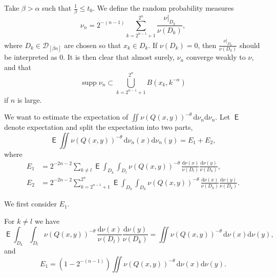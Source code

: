 \documentclass[AHL,Unicode,longabstracts]{cedram}
\DeclareMathOperator{\supp}{supp}
\DeclareMathOperator{\E}{\mathsf{E}}
\newcommand*{\dd}{\mathrm{d}}
\begin{document}
Take $\beta > \alpha$ such that $\frac{1}{\beta} \leq t_0$. We define the random probability measures
\[
\nu_n = 2^{-(n-1)} \sum_{k=2^{n-1}+1}^{2^n} \frac{\nu|_{D_k}}{\nu (D_k)},
\]
where $D_k \in \mathscr{D}_{[\beta n]}$ are chosen so that $x_k \in D_k$. If $\nu (D_k) = 0$, then $\frac{\nu|_{D_k}}{\nu (D_k)}$ should be interpreted as $0$. It is then clear that almost surely, $\nu_n$ converge weakly to $\nu$, and that
\[
\supp \nu_n \subset \bigcup_{k=2^{n-1}+1}^{2^n} B (x_k, k^{-\alpha})
\]
if $n$ is large.

We want to estimate the expectation of $\iint \nu(Q(x,y))^{-\theta} \,
\dd \nu_n \dd \nu_n$. Let $\E$ denote expectation and split the expectation into two parts,
\[
\E \iint \nu (Q(x,y))^{-\theta} \, \dd \nu_n (x) \dd
\nu_n (y) = E_1 + E_2,
\]
where
\begin{align*}
E_1 &= 2^{-2n-2} \sum_{k \neq l} \E \int_{D_k} \int_{D_l} \nu (Q(x,y))^{-\theta} \, \frac{\dd \nu (x)}{\nu (D_l)}
\frac{\dd \nu (y)}{\nu (D_k)}, \\ E_2 &= 2^{-2n-2}
\sum_{k=2^{n-1}+1}^{2^n} \E \int_{D_k} \int_{D_k} \nu (Q(x,y))^{-\theta} \, \frac{\dd \nu (x)}{\nu (D_k)}
\frac{\dd \nu (y)}{\nu (D_k)}.
\end{align*}

We first consider $E_1$.

\begin{lemm}\label{lem:E1}
For $k \neq l$ we have
\[
\E \int_{D_k} \int_{D_l} \nu (Q(x,y))^{-\theta} \, \frac{\dd
\nu (x)}{\nu (D_l)} \frac{\dd \nu (y)}{\nu (D_k)} = \iint
\nu(Q(x,y))^{-\theta} \, \dd \nu (x) \dd \nu (y),
\]
and
\[
E_1 = (1 - 2^{-(n-1)}) \iint \nu(Q(x,y))^{-\theta} \, \dd \nu (x) \dd \nu (y).
\]
\end{lemm}
\end{document}
